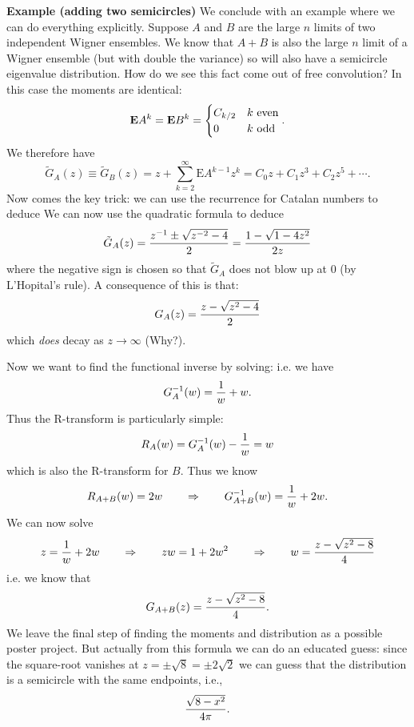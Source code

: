 \textbf{Example (adding two semicircles)} We conclude with an example where we can do everything explicitly. Suppose $A$ and $B$ are the large $n$ limits of two independent Wigner ensembles. We know that $A+B$ is also the large $n$ limit of a Wigner ensemble (but with double the variance) so will also have a semicircle eigenvalue distribution. How do we see this fact come out of free convolution? In this case the moments are identical:
\[
\ensuremath{\bm{\mathrm{E}}} A^k = \ensuremath{\bm{\mathrm{E}}} B^k = \begin{cases} C_{k/2} & k\hbox{ even} \\
    0 & k\hbox{ odd} \end{cases}.
\]
We therefore have
\[
\tilde{G}_A(z) \ensuremath{\equiv} \tilde{G}_B(z) = z + \ensuremath{\sum}_{k=2}^\ensuremath{\infty} \ensuremath{\bm{\mathrm{E}}} A^{k-1} z^k = C_0 z + C_1 z^3 + C_2 z^5 + \ensuremath{\cdots}.
\]
Now comes the key trick: we can use the recurrence for Catalan numbers to deduce
We can now use the quadratic formula to deduce
\[
\tilde{G}_A(z) = {z^{-1} \ensuremath{\pm} \sqrt{z^{-2} -4} \over 2} = {1 - \sqrt{1 -4 z^2} \over 2 z}
\]
where the negative sign is chosen so that $\tilde{G}_A$ does not blow up at $0$ (by L'Hopital's rule).  A consequence of this is that:
\[
G_A(z) = {z - \sqrt{z^2 -4} \over 2}
\]
which \emph{does} decay as $z \ensuremath{\rightarrow} \ensuremath{\infty}$ (Why?). 

Now we want to find the functional inverse by solving:
i.e. we have
\[
G_A^{-1}(w) = {1 \over w} +w.
\]
Thus the R-transform is particularly simple:
\[
R_A(w) = G_A^{-1}(w) - {1 \over w} = w
\]
which is also the R-transform for $B$. Thus we know
\[
R_{A+B}(w) = 2 w \qquad \ensuremath{\Rightarrow} \qquad G_{A+B}^{-1}(w) = {1 \over w} + 2w.
\]
We can now solve
\[
z = {1 \over w} + 2w \qquad \Rightarrow \qquad zw = 1 + 2w^2 \qquad \Rightarrow \qquad w = {z - \sqrt{z^2 - 8} \over 4}
\]
i.e. we know that
\[
G_{A+B}(z) = {z - \sqrt{z^2 - 8} \over 4}.
\]
We leave the final step of finding the moments and distribution as a possible poster project. But actually from this formula we can do an educated guess: since the square-root vanishes at $z = \ensuremath{\pm}\sqrt{8} = \ensuremath{\pm}2 \sqrt{2}$ we can guess that the distribution is a semicircle with the same endpoints, i.e.,
\[
{\sqrt{8 - x^2} \over 4 \ensuremath{\pi}}.
\]
